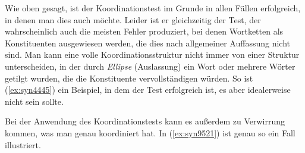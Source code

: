 \begin{exe}
  \ex\label{ex:syn4444}
  \begin{xlist}
    \begin{xlist}
    \end{xlist}
  \end{xlist}
\end{exe}

Wie oben gesagt, ist der Koordinationstest im Grunde in allen Fällen erfolgreich, in denen man dies auch möchte.
Leider ist er gleichzeitig der Test, der wahrscheinlich auch die meisten Fehler produziert, bei denen Wortketten als Konstituenten ausgewiesen werden, die dies nach allgemeiner Auffassung nicht sind.
Man kann eine volle Koordinationsstruktur nicht immer von einer Struktur unterscheiden, in der durch \textit{Ellipse} (Auslassung) ein Wort oder mehrere Wörter getilgt wurden, die die Konstituente vervollständigen würden.
So ist \zB (\ref{ex:syn4445}) ein Beispiel, in dem der Test erfolgreich ist, es aber idealerweise nicht sein sollte.

\begin{sloppypar}
\begin{exe}
\end{exe}
\end{sloppypar}

Bei der Anwendung des Koordinationstests kann es außerdem zu Verwirrung kommen, was man genau koordiniert hat.
In (\ref{ex:syn9521}) ist genau so ein Fall illustriert.

